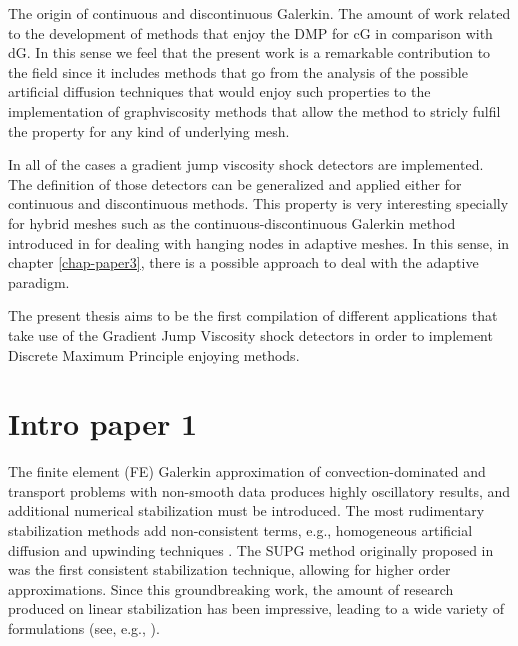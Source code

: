 The origin of continuous and discontinuous Galerkin. The amount of work related to the development of methods that enjoy the DMP for cG in comparison with dG. In this sense we feel that the present work is a remarkable contribution to the field since it includes methods that go from the analysis of the possible artificial diffusion techniques that would enjoy such properties to the implementation of graphviscosity methods that allow the method to stricly fulfil the property for any kind of underlying mesh.

In all of the cases a gradient jump viscosity shock detectors are implemented. The definition of those detectors can be generalized and applied either for continuous and discontinuous methods. This property is very interesting specially for hybrid meshes such as the continuous-discontinuous Galerkin method introduced in \cite{badia_adaptive_2013} for dealing with hanging nodes in adaptive meshes. In this sense, in chapter \ref{chap-paper3}, there is a possible approach to deal with the adaptive paradigm.

The present thesis aims to be the first compilation of different applications that take use of the Gradient Jump Viscosity shock detectors in order to implement Discrete Maximum Principle enjoying methods.

\section{Intro paper 1}

The finite element (FE) Galerkin approximation of convection-dominated and transport problems
with non-smooth data produces highly oscillatory results, and additional numerical stabilization must be
introduced. The most rudimentary stabilization methods add non-consistent terms, e.g., homogeneous artificial diffusion and upwinding techniques \cite{von_neumann_method_1950}. 
The SUPG method originally proposed in \cite{brooks_streamline_1982} was the first consistent stabilization technique, 
allowing for higher order approximations. Since this groundbreaking
work, the amount of research produced on linear stabilization has been impressive, leading to a wide 
variety of formulations (see, e.g., \cite{hughes_variational_1998,codina_finite_1997,becker_finite_2001,guermond_stabilization_1999}). 


